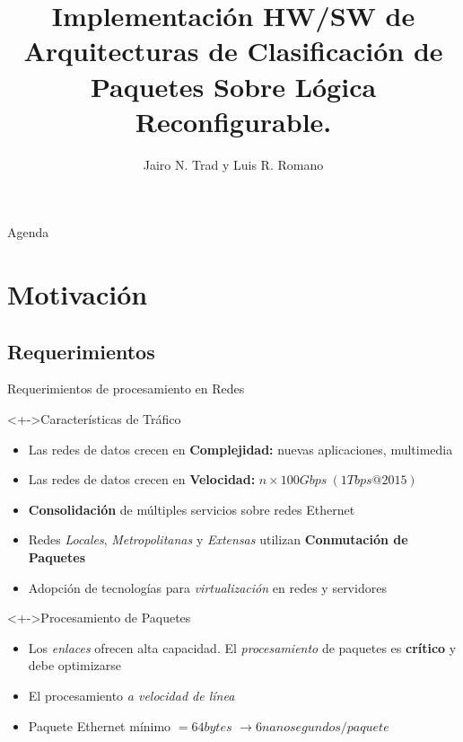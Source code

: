 \documentclass[xcolor=dvipsnames]{beamer}
\title[] {Implementación HW/SW de Arquitecturas de Clasificación de Paquetes Sobre Lógica Reconfigurable.}
\author[] {Jairo N. Trad y Luis R. Romano}
\institute[Universidades] %
{
  \scriptsize Laboratorio de Comunicaciones Digitales \\
  \scriptsize Universidad Nacional de Córdoba, Facultad Ciencias Exactas, Físicas y Naturales \\ 
}
\begin{document}
\begin{frame}
  \titlepage
\end{frame}

\begin{frame}{Agenda}
  \tiny	
  \tableofcontents
\end{frame}

\scriptsize

\section{Motivación}

\subsection{Requerimientos}

\begin{frame}{Requerimientos de procesamiento en Redes}
  \scriptsize
  
  \begin{block}<+->{Características de Tráfico}

    \begin{itemize}
      \item Las redes de datos crecen en {\bf Complejidad:} nuevas aplicaciones, multimedia

      \item Las redes de datos crecen en {\bf Velocidad:} $n \times 100 Gbps\ (1Tbps@2015)$

      \item {\bf Consolidación} de múltiples servicios sobre redes Ethernet
      
      \item Redes \emph{Locales}, \emph{Metropolitanas} y \emph{Extensas} utilizan {\bf Conmutación de Paquetes}

      \item Adopción de tecnologías para \emph{virtualización} en redes y servidores
    \end{itemize}
    
  \end{block}
    
  \begin{block}<+->{Procesamiento de Paquetes}
    \begin{itemize}

      \item Los \emph{enlaces} ofrecen alta capacidad. El \emph{procesamiento} de paquetes es {\bf crítico} y debe optimizarse

      \item El procesamiento \emph{a velocidad de línea}

      \item Paquete Ethernet mínimo $=64 bytes$ $\rightarrow 6 nanosegundos/paquete$  
    \end{itemize}    
  \end{block}

\end{frame}
\end{document}
